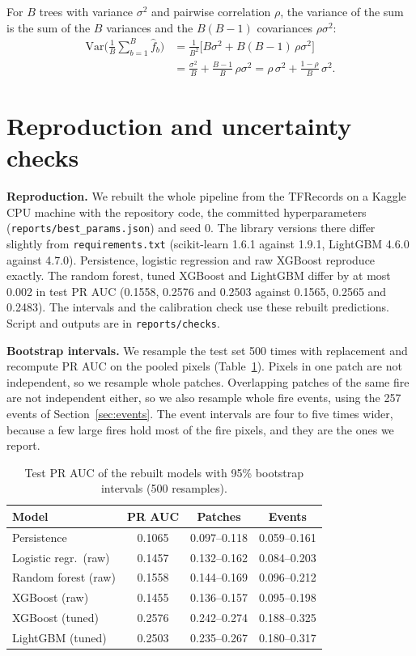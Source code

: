 For $B$ trees with variance $\sigma^2$ and pairwise correlation $\rho$, the variance of the sum is the sum
of the $B$ variances and the $B(B-1)$ covariances $\rho\sigma^2$:
\begin{align}
\mathrm{Var}\Big(\frac{1}{B}\sum_{b=1}^{B} \hat{f}_b\Big)
&= \frac{1}{B^2}\Big[ B\sigma^2 + B(B-1)\,\rho\sigma^2 \Big] \nonumber\\
&= \frac{\sigma^2}{B} + \frac{B-1}{B}\,\rho\sigma^2
 = \rho\,\sigma^2 + \frac{1-\rho}{B}\,\sigma^2 .
\end{align}

\section{Reproduction and uncertainty checks}
\label{app:checks}

\textbf{Reproduction.} We rebuilt the whole pipeline from the TFRecords on a Kaggle CPU machine with the
repository code, the committed hyperparameters (\texttt{reports/best\_params.json}) and seed 0. The
library versions there differ slightly from \texttt{requirements.txt} (scikit-learn 1.6.1 against 1.9.1,
LightGBM 4.6.0 against 4.7.0). Persistence, logistic regression and raw XGBoost reproduce exactly. The
random forest, tuned XGBoost and LightGBM differ by at most 0.002 in test PR AUC (0.1558, 0.2576 and
0.2503 against 0.1565, 0.2565 and 0.2483). The intervals and the calibration check use these rebuilt
predictions. Script and outputs are in \texttt{reports/checks}.

\textbf{Bootstrap intervals.} We resample the test set 500 times with replacement and recompute PR AUC
on the pooled pixels (Table~\ref{tab:ci}). Pixels in one patch are not independent, so we resample whole
patches. Overlapping patches of the same fire are not independent either, so we also resample whole fire
events, using the 257 events of Section~\ref{sec:events}. The event intervals are four to five times wider,
because a few large fires hold most of the fire pixels, and they are the ones we report.

\begin{table}[h]
\centering
\caption{Test PR AUC of the rebuilt models with 95\% bootstrap intervals (500 resamples).}
\label{tab:ci}
\small
\renewcommand{\arraystretch}{1.12}
\setlength{\tabcolsep}{4pt}
\begin{tabular}{lccc}
\toprule
\rowcolor{tblhead}
\textbf{Model} & \textbf{PR AUC} & \textbf{Patches} & \textbf{Events} \\
\midrule
Persistence & 0.1065 & 0.097--0.118 & 0.059--0.161 \\
Logistic regr.\ (raw) & 0.1457 & 0.132--0.162 & 0.084--0.203 \\
Random forest (raw) & 0.1558 & 0.144--0.169 & 0.096--0.212 \\
XGBoost (raw) & 0.1455 & 0.136--0.157 & 0.095--0.198 \\
\rowcolor{tblours}
XGBoost (tuned) & 0.2576 & 0.242--0.274 & 0.188--0.325 \\
LightGBM (tuned) & 0.2503 & 0.235--0.267 & 0.180--0.317 \\
\bottomrule
\end{tabular}
\end{table}


